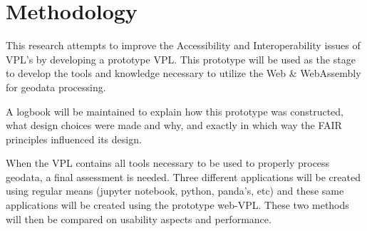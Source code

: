 \newpage
\section{Methodology}
This research attempts to improve the Accessibility and Interoperability issues of VPL's by developing a prototype VPL. 
This prototype will be used as the stage to develop the tools and knowledge necessary to utilize the Web \& WebAssembly for geodata processing.   

\par
A logbook will be maintained to explain how this prototype was constructed, what design choices were made and why, and exactly in which way the FAIR principles influenced its design. 

\par
When the VPL contains all tools necessary to be used to properly process geodata, a final assessment is needed. 
Three different applications will be created using regular means (jupyter notebook, python, panda's, etc)
and these same applications will be created using the prototype web-VPL. 
These two methods will then be compared on usability aspects and performance.   

